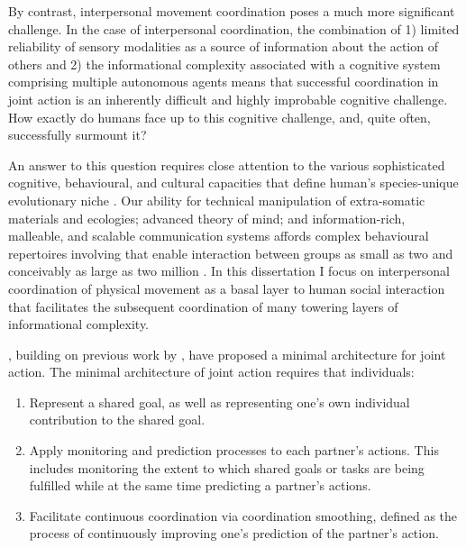 \begin{CJK}{UTF8}{gbsn}
By contrast, interpersonal movement coordination poses a much more significant challenge.  In the case of interpersonal coordination, the combination of 1) limited reliability of sensory modalities as a source of information about the action of others \citep{Wilson2005,Wolpert2003,Frith2007} and 2) the informational complexity associated with a cognitive system comprising multiple autonomous agents \citep{Bernstein1967} means that successful coordination in joint action is an inherently difficult and highly improbable cognitive challenge.  How exactly do humans face up to this cognitive challenge, and, quite often, successfully surmount it?

An answer to this question requires close attention to the various sophisticated cognitive, behavioural, and cultural capacities that define human's species-unique evolutionary niche \citep{Roepstorff2010,Clark2015,Fuentes2016}. Our ability for technical manipulation of extra-somatic materials and ecologies; advanced theory of mind; and information-rich, malleable, and scalable communication systems affords complex behavioural repertoires involving that enable interaction between groups as small as two and conceivably as large as two million \citep{Nowak2017}.  In this dissertation I focus on interpersonal coordination of physical movement as a basal layer to human social interaction that facilitates the subsequent coordination of many towering layers of informational complexity.

\textcite{Vesper2010}, building on previous work by  \textcite{Sebanz2006}, have proposed a minimal architecture for joint action.  The minimal architecture of joint action requires that individuals:

\begin{enumerate}
  \item Represent a shared goal, as well as representing one’s own individual contribution to the shared goal.
  \item Apply monitoring and prediction processes to each partner’s actions. This includes monitoring the extent to which shared goals or tasks are being fulfilled while at the same time predicting a partner’s actions.
  \item Facilitate continuous coordination via coordination smoothing, defined as the process of continuously improving one’s prediction of the partner’s action.
\end{enumerate}


\end{CJK}
